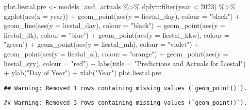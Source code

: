 \documentclass[
]{article}
\newenvironment{Shaded}{\begin{snugshade}}{\end{snugshade}}
\newcommand{\AttributeTok}[1]{\textcolor[rgb]{0.77,0.63,0.00}{#1}}
\newcommand{\DecValTok}[1]{\textcolor[rgb]{0.00,0.00,0.81}{#1}}
\newcommand{\FunctionTok}[1]{\textcolor[rgb]{0.00,0.00,0.00}{#1}}
\newcommand{\NormalTok}[1]{#1}
\newcommand{\OtherTok}[1]{\textcolor[rgb]{0.56,0.35,0.01}{#1}}
\newcommand{\SpecialCharTok}[1]{\textcolor[rgb]{0.00,0.00,0.00}{#1}}
\newcommand{\StringTok}[1]{\textcolor[rgb]{0.31,0.60,0.02}{#1}}
\begin{document}
\begin{Shaded}
\begin{Highlighting}[]
\NormalTok{plot.liestal.pre }\OtherTok{\textless{}{-}}\NormalTok{ models\_and\_actuals }\SpecialCharTok{\%\textgreater{}\%}\NormalTok{ dplyr}\SpecialCharTok{::}\FunctionTok{filter}\NormalTok{(year }\SpecialCharTok{\textless{}} \DecValTok{2023}\NormalTok{) }\SpecialCharTok{\%\textgreater{}\%} 
  \FunctionTok{ggplot}\NormalTok{(}\FunctionTok{aes}\NormalTok{(}\AttributeTok{x =}\NormalTok{ year)) }\SpecialCharTok{+}
  \FunctionTok{geom\_point}\NormalTok{(}\FunctionTok{aes}\NormalTok{(}\AttributeTok{y =}\NormalTok{ liestal\_day), }\AttributeTok{colour =} \StringTok{"black"}\NormalTok{) }\SpecialCharTok{+}
  \FunctionTok{geom\_line}\NormalTok{(}\FunctionTok{aes}\NormalTok{(}\AttributeTok{y =}\NormalTok{ liestal\_day), }\AttributeTok{colour =} \StringTok{"black"}\NormalTok{) }\SpecialCharTok{+}
  \FunctionTok{geom\_point}\NormalTok{(}\FunctionTok{aes}\NormalTok{(}\AttributeTok{y =}\NormalTok{ liestal\_dk), }\AttributeTok{colour =} \StringTok{"blue"}\NormalTok{) }\SpecialCharTok{+}
  \FunctionTok{geom\_point}\NormalTok{(}\FunctionTok{aes}\NormalTok{(}\AttributeTok{y =}\NormalTok{ liestal\_kkw), }\AttributeTok{colour =} \StringTok{"green"}\NormalTok{) }\SpecialCharTok{+}
  \FunctionTok{geom\_point}\NormalTok{(}\FunctionTok{aes}\NormalTok{(}\AttributeTok{y =}\NormalTok{ liestal\_mh), }\AttributeTok{colour =} \StringTok{"violet"}\NormalTok{) }\SpecialCharTok{+}
  \FunctionTok{geom\_point}\NormalTok{(}\FunctionTok{aes}\NormalTok{(}\AttributeTok{y =}\NormalTok{ liestal\_sl), }\AttributeTok{colour =} \StringTok{"orange"}\NormalTok{) }\SpecialCharTok{+}
  \FunctionTok{geom\_point}\NormalTok{(}\FunctionTok{aes}\NormalTok{(}\AttributeTok{y =}\NormalTok{ liestal\_syy), }\AttributeTok{colour =} \StringTok{"red"}\NormalTok{) }\SpecialCharTok{+}
  \FunctionTok{labs}\NormalTok{(}\AttributeTok{title =} \StringTok{"Predictions and Actuals for Liestal"}\NormalTok{) }\SpecialCharTok{+}
  \FunctionTok{ylab}\NormalTok{(}\StringTok{"Day of Year"}\NormalTok{) }\SpecialCharTok{+}
  \FunctionTok{xlab}\NormalTok{(}\StringTok{"Year"}\NormalTok{)}
\NormalTok{plot.liestal.pre}
\end{Highlighting}
\end{Shaded}

\begin{verbatim}
## Warning: Removed 1 rows containing missing values (`geom_point()`).
\end{verbatim}

\begin{verbatim}
## Warning: Removed 3 rows containing missing values (`geom_point()`).
\end{verbatim}
\end{document}
